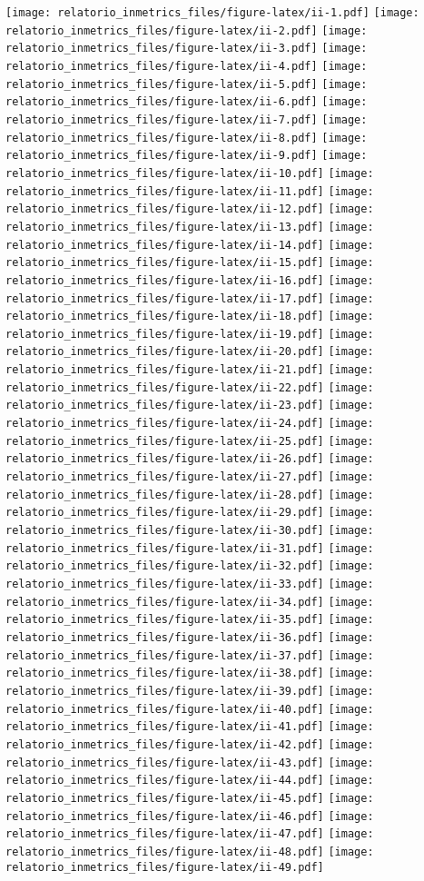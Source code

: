 \documentclass[]{book}
\begin{document}
\texttt{[image: relatorio\_inmetrics\_files/figure-latex/ii-1.pdf]} \texttt{[image: relatorio\_inmetrics\_files/figure-latex/ii-2.pdf]} \texttt{[image: relatorio\_inmetrics\_files/figure-latex/ii-3.pdf]} \texttt{[image: relatorio\_inmetrics\_files/figure-latex/ii-4.pdf]} \texttt{[image: relatorio\_inmetrics\_files/figure-latex/ii-5.pdf]} \texttt{[image: relatorio\_inmetrics\_files/figure-latex/ii-6.pdf]} \texttt{[image: relatorio\_inmetrics\_files/figure-latex/ii-7.pdf]} \texttt{[image: relatorio\_inmetrics\_files/figure-latex/ii-8.pdf]} \texttt{[image: relatorio\_inmetrics\_files/figure-latex/ii-9.pdf]} \texttt{[image: relatorio\_inmetrics\_files/figure-latex/ii-10.pdf]} \texttt{[image: relatorio\_inmetrics\_files/figure-latex/ii-11.pdf]} \texttt{[image: relatorio\_inmetrics\_files/figure-latex/ii-12.pdf]} \texttt{[image: relatorio\_inmetrics\_files/figure-latex/ii-13.pdf]} \texttt{[image: relatorio\_inmetrics\_files/figure-latex/ii-14.pdf]} \texttt{[image: relatorio\_inmetrics\_files/figure-latex/ii-15.pdf]} \texttt{[image: relatorio\_inmetrics\_files/figure-latex/ii-16.pdf]} \texttt{[image: relatorio\_inmetrics\_files/figure-latex/ii-17.pdf]} \texttt{[image: relatorio\_inmetrics\_files/figure-latex/ii-18.pdf]} \texttt{[image: relatorio\_inmetrics\_files/figure-latex/ii-19.pdf]} \texttt{[image: relatorio\_inmetrics\_files/figure-latex/ii-20.pdf]} \texttt{[image: relatorio\_inmetrics\_files/figure-latex/ii-21.pdf]} \texttt{[image: relatorio\_inmetrics\_files/figure-latex/ii-22.pdf]} \texttt{[image: relatorio\_inmetrics\_files/figure-latex/ii-23.pdf]} \texttt{[image: relatorio\_inmetrics\_files/figure-latex/ii-24.pdf]} \texttt{[image: relatorio\_inmetrics\_files/figure-latex/ii-25.pdf]} \texttt{[image: relatorio\_inmetrics\_files/figure-latex/ii-26.pdf]} \texttt{[image: relatorio\_inmetrics\_files/figure-latex/ii-27.pdf]} \texttt{[image: relatorio\_inmetrics\_files/figure-latex/ii-28.pdf]} \texttt{[image: relatorio\_inmetrics\_files/figure-latex/ii-29.pdf]} \texttt{[image: relatorio\_inmetrics\_files/figure-latex/ii-30.pdf]} \texttt{[image: relatorio\_inmetrics\_files/figure-latex/ii-31.pdf]} \texttt{[image: relatorio\_inmetrics\_files/figure-latex/ii-32.pdf]} \texttt{[image: relatorio\_inmetrics\_files/figure-latex/ii-33.pdf]} \texttt{[image: relatorio\_inmetrics\_files/figure-latex/ii-34.pdf]} \texttt{[image: relatorio\_inmetrics\_files/figure-latex/ii-35.pdf]} \texttt{[image: relatorio\_inmetrics\_files/figure-latex/ii-36.pdf]} \texttt{[image: relatorio\_inmetrics\_files/figure-latex/ii-37.pdf]} \texttt{[image: relatorio\_inmetrics\_files/figure-latex/ii-38.pdf]} \texttt{[image: relatorio\_inmetrics\_files/figure-latex/ii-39.pdf]} \texttt{[image: relatorio\_inmetrics\_files/figure-latex/ii-40.pdf]} \texttt{[image: relatorio\_inmetrics\_files/figure-latex/ii-41.pdf]} \texttt{[image: relatorio\_inmetrics\_files/figure-latex/ii-42.pdf]} \texttt{[image: relatorio\_inmetrics\_files/figure-latex/ii-43.pdf]} \texttt{[image: relatorio\_inmetrics\_files/figure-latex/ii-44.pdf]} \texttt{[image: relatorio\_inmetrics\_files/figure-latex/ii-45.pdf]} \texttt{[image: relatorio\_inmetrics\_files/figure-latex/ii-46.pdf]} \texttt{[image: relatorio\_inmetrics\_files/figure-latex/ii-47.pdf]} \texttt{[image: relatorio\_inmetrics\_files/figure-latex/ii-48.pdf]} \texttt{[image: relatorio\_inmetrics\_files/figure-latex/ii-49.pdf]} 
\end{document}
